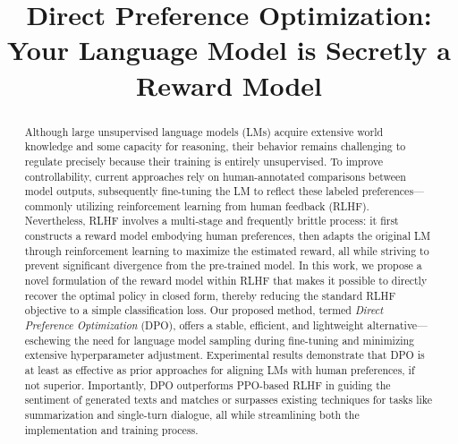 \title{Direct Preference Optimization: Your Language Model is Secretly a Reward Model}

\begin{abstract}
Although large unsupervised language models (LMs) acquire extensive world knowledge and some capacity for reasoning, their behavior remains challenging to regulate precisely because their training is entirely unsupervised. To improve controllability, current approaches rely on human-annotated comparisons between model outputs, subsequently fine-tuning the LM to reflect these labeled preferences—commonly utilizing reinforcement learning from human feedback (RLHF). Nevertheless, RLHF involves a multi-stage and frequently brittle process: it first constructs a reward model embodying human preferences, then adapts the original LM through reinforcement learning to maximize the estimated reward, all while striving to prevent significant divergence from the pre-trained model. In this work, we propose a novel formulation of the reward model within RLHF that makes it possible to directly recover the optimal policy in closed form, thereby reducing the standard RLHF objective to a simple classification loss. Our proposed method, termed \textit{Direct Preference Optimization} (DPO), offers a stable, efficient, and lightweight alternative—eschewing the need for language model sampling during fine-tuning and minimizing extensive hyperparameter adjustment. Experimental results demonstrate that DPO is at least as effective as prior approaches for aligning LMs with human preferences, if not superior. Importantly, DPO outperforms PPO-based RLHF in guiding the sentiment of generated texts and matches or surpasses existing techniques for tasks like summarization and single-turn dialogue, all while streamlining both the implementation and training process.
\end{abstract}

